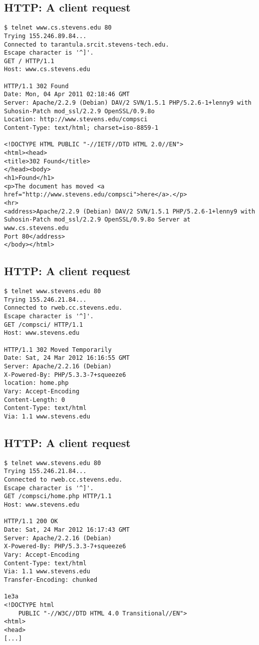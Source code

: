\documentclass[xga]{xdvislides}
\begin{document}
\subsection{HTTP: A client request}
\smallish
\begin{center}
\begin{verbatim}
$ telnet www.cs.stevens.edu 80
Trying 155.246.89.84...
Connected to tarantula.srcit.stevens-tech.edu.
Escape character is '^]'.
GET / HTTP/1.1
Host: www.cs.stevens.edu

HTTP/1.1 302 Found
Date: Mon, 04 Apr 2011 02:18:46 GMT
Server: Apache/2.2.9 (Debian) DAV/2 SVN/1.5.1 PHP/5.2.6-1+lenny9 with Suhosin-Patch mod_ssl/2.2.9 OpenSSL/0.9.8o
Location: http://www.stevens.edu/compsci
Content-Type: text/html; charset=iso-8859-1

<!DOCTYPE HTML PUBLIC "-//IETF//DTD HTML 2.0//EN">
<html><head>
<title>302 Found</title>
</head><body>
<h1>Found</h1>
<p>The document has moved <a href="http://www.stevens.edu/compsci">here</a>.</p>
<hr>
<address>Apache/2.2.9 (Debian) DAV/2 SVN/1.5.1 PHP/5.2.6-1+lenny9 with Suhosin-Patch mod_ssl/2.2.9 OpenSSL/0.9.8o Server at www.cs.stevens.edu
Port 80</address>
</body></html>

\end{verbatim}
\end{center}
\Normalsize

\subsection{HTTP: A client request}
\smallish
\begin{verbatim}
$ telnet www.stevens.edu 80
Trying 155.246.21.84...
Connected to rweb.cc.stevens.edu.
Escape character is '^]'.
GET /compsci/ HTTP/1.1
Host: www.stevens.edu

HTTP/1.1 302 Moved Temporarily
Date: Sat, 24 Mar 2012 16:16:55 GMT
Server: Apache/2.2.16 (Debian)
X-Powered-By: PHP/5.3.3-7+squeeze6
location: home.php
Vary: Accept-Encoding
Content-Length: 0
Content-Type: text/html
Via: 1.1 www.stevens.edu

\end{verbatim}
\Normalsize

\subsection{HTTP: A client request}
\smallish
\begin{verbatim}
$ telnet www.stevens.edu 80
Trying 155.246.21.84...
Connected to rweb.cc.stevens.edu.
Escape character is '^]'.
GET /compsci/home.php HTTP/1.1
Host: www.stevens.edu

HTTP/1.1 200 OK
Date: Sat, 24 Mar 2012 16:17:43 GMT
Server: Apache/2.2.16 (Debian)
X-Powered-By: PHP/5.3.3-7+squeeze6
Vary: Accept-Encoding
Content-Type: text/html
Via: 1.1 www.stevens.edu
Transfer-Encoding: chunked

1e3a
<!DOCTYPE html
	PUBLIC "-//W3C//DTD HTML 4.0 Transitional//EN">
<html>
<head>
[...]
\end{verbatim}
\Normalsize
\end{document}
